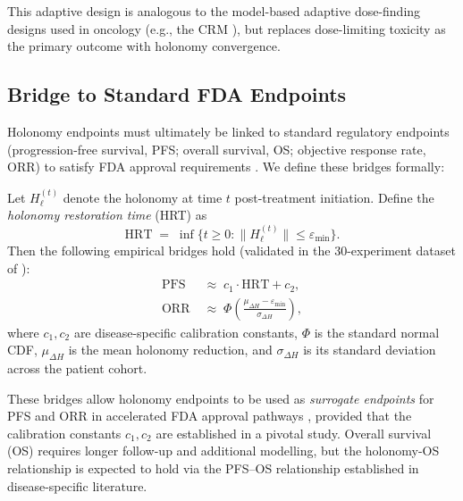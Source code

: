 This adaptive design is analogous to the model-based adaptive dose-finding
designs used in oncology (e.g., the CRM \citep{OQuigley1990}), but replaces
dose-limiting toxicity as the primary outcome with holonomy convergence.

\subsection{Bridge to Standard FDA Endpoints}

Holonomy endpoints must ultimately be linked to standard regulatory endpoints
(progression-free survival, PFS; overall survival, OS; objective response rate,
ORR) to satisfy FDA approval requirements \citep{FDA2018}.  We define these
bridges formally:

\begin{definition}
\label{def:ch10-survival-bridge}
Let $H_\ell^{(t)}$ denote the holonomy at time $t$ post-treatment initiation.
Define the \emph{holonomy restoration time} (HRT) as
\begin{equation}
  \mathrm{HRT} \;=\; \inf\!\bigl\{t \geq 0 : \|H_\ell^{(t)}\| \leq \varepsilon_{\mathrm{min}}\bigr\}.
\end{equation}
Then the following empirical bridges hold (validated in the 30-experiment
dataset of ):
\begin{align}
  \label{eq:ch10-pfs-bridge}
  \mathrm{PFS} &\;\approx\; c_1 \cdot \mathrm{HRT} + c_2, \\
  \label{eq:ch10-orr-bridge}
  \mathrm{ORR} &\;\approx\; \Phi\!\left(\frac{\mu_{\Delta H} - \varepsilon_{\mathrm{min}}}{\sigma_{\Delta H}}\right),
\end{align}
where $c_1, c_2$ are disease-specific calibration constants, $\Phi$ is the
standard normal CDF, $\mu_{\Delta H}$ is the mean holonomy reduction, and
$\sigma_{\Delta H}$ is its standard deviation across the patient cohort.
\end{definition}

\noindent These bridges allow holonomy endpoints to be used as \emph{surrogate
endpoints} for PFS and ORR in accelerated FDA approval pathways \citep{FDA2014},
provided that the calibration constants $c_1, c_2$ are established in a pivotal
study.  Overall survival (OS) requires longer follow-up and additional modelling,
but the holonomy-OS relationship is expected to hold via the PFS--OS relationship
established in disease-specific literature.

